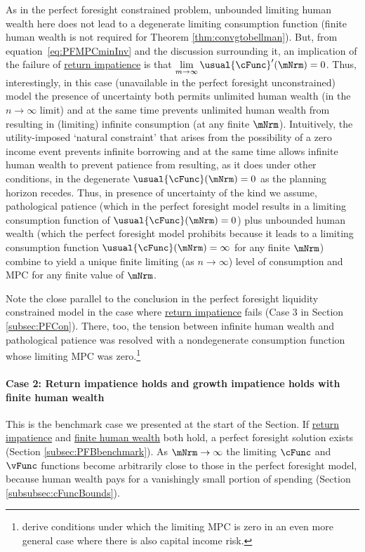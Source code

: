 \documentclass[BufferStockTheory]{subfiles}
\begin{document}
As in the perfect foresight constrained problem, unbounded limiting human wealth here does not lead to a degenerate limiting consumption function (finite human wealth is not required for Theorem \ref{thm:convgtobellman}).
But, from equation~\eqref{eq:PFMPCminInv} and the discussion surrounding it, an implication of the failure of \hyperlink{RIC}{return impatience} is that $\lim\limits_{m \rightarrow \infty} \usual{\cFunc}^{\prime}(\mNrm) = 0$.
Thus, interestingly, in this case (unavailable in the perfect foresight unconstrained) model the presence of uncertainty both permits unlimited human wealth (in the $n\rightarrow\infty$ limit) and at the same time prevents unlimited human wealth from resulting in (limiting) infinite consumption (at any finite $\mNrm$).
Intuitively, the utility-imposed `natural constraint' that arises from the possibility of a zero income event prevents infinite borrowing and at the same time allows infinite human wealth to prevent patience from resulting, as it does under other conditions, in the degenerate $\usual{\cFunc}(\mNrm)=0$ as the planning horizon recedes.
Thus, in presence of uncertainty of the kind we assume, pathological patience (which in the perfect foresight model results in a limiting consumption function of $\usual{\cFunc}(\mNrm)=0$) plus unbounded human wealth (which the perfect foresight model prohibits because it leads to a limiting consumption function $\usual{\cFunc}(\mNrm)=\infty$ for any finite $\mNrm$) combine to yield a unique finite limiting (as $n \rightarrow \infty$) level of consumption and MPC for any finite value of $\mNrm$.


Note the close parallel to the conclusion in the perfect foresight liquidity constrained model in the case where \hyperlink{RIC}{return impatience} fails (Case 3 in Section \ref{subsec:PFCon}).
There, too, the tension between infinite human wealth and pathological patience was resolved with a nondegenerate consumption function whose limiting MPC was zero.\footnote{\cite{maTodaRich} derive conditions under which the limiting MPC is zero in an even more general case where there is also capital income risk.}

\hypertarget{When-the-RIC-Holds}{}
\paragraph{Case 2: Return impatience holds and growth impatience holds with finite human wealth} 
This is the benchmark case we presented at the start of the Section.
If \hyperlink{RIC}{return impatience}  and \hyperlink{FHWC}{finite human wealth} both hold, a perfect foresight solution exists (Section \ref{subsec:PFBbenchmark}).
As $\mNrm \rightarrow \infty$ the limiting $\cFunc$ and $\vFunc$ functions become arbitrarily close to those in the perfect foresight model, because human wealth pays for a vanishingly small portion of spending (Section \ref{subsubsec:cFuncBounds}).
\end{document}
